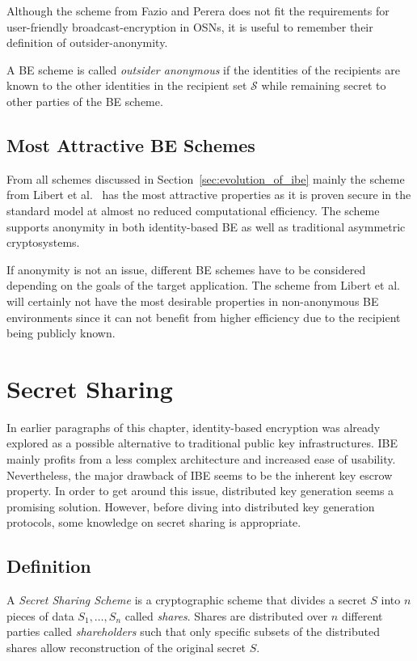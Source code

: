 Although the scheme from Fazio and Perera does not fit the requirements for user-friendly broadcast-encryption in OSNs, it is useful to remember their definition of outsider-anonymity.

\begin{defn}
\label{def:outsider_anonymity}
 A BE scheme is called \textit{outsider anonymous} if the identities of the recipients are known to the other identities in the recipient set $\mathcal{S}$ while remaining secret to other parties of the BE scheme.
\end{defn}

\subsection{Most Attractive BE Schemes}
From all schemes discussed in Section~\ref{sec:evolution_of_ibe} mainly the scheme from Libert et al.~\cite{art:LibertQ03} has the most attractive properties as it is proven secure in the standard model at almost no reduced computational efficiency. The scheme supports anonymity in both identity-based BE as well as traditional asymmetric cryptosystems.

If anonymity is not an issue, different BE schemes have to be considered depending on the goals of the target application. The scheme from Libert et al.~\cite{art:LibertPQ12} will certainly not have the most desirable properties in non-anonymous BE environments since it can not benefit from higher efficiency due to the recipient being publicly known.

\section{Secret Sharing}
In earlier paragraphs of this chapter, identity-based encryption was already explored as a possible alternative to traditional public key infrastructures. IBE mainly profits from a less complex architecture and increased ease of usability. Nevertheless, the major drawback of IBE seems to be the inherent key escrow property. In order to get around this issue, distributed key generation seems a promising solution. However, before diving into distributed key generation protocols, some knowledge on secret sharing is appropriate.

\subsection{Definition}
\begin{defn}
\label{def:secret_sharing_scheme}
 A \textit{Secret Sharing Scheme} is a cryptographic scheme that divides a secret $S$ into $n$ pieces of data $S_1, \ldots, S_n$ called \textit{shares}. Shares are distributed over $n$ different parties called \textit{shareholders} such that only specific subsets of the distributed shares allow reconstruction of the original secret $S$.
\end{defn}

